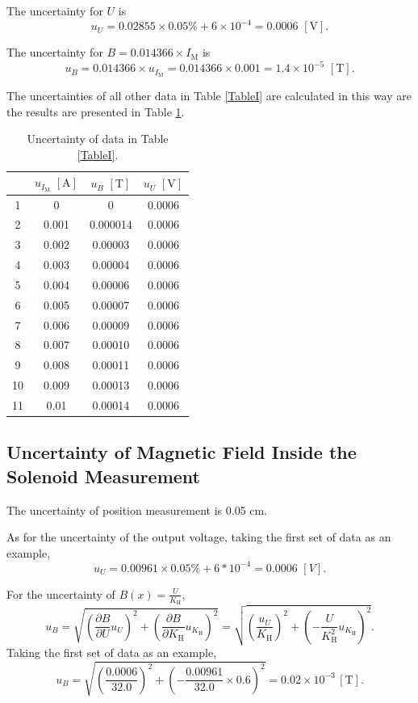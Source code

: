 \documentclass{article}
\begin{document}
The uncertainty for $U$ is 
$$u_U = 0.02855\times 0.05\%+6\times10^{-4} = 0.0006\,\,[\text{V}].$$

The uncertainty for $B = 0.014366 \times I_\text{M}$ is
$$u_B = 0.014366 \times u_{I_\text{M}} = 0.014366 \times 0.001 = 1.4\times 10^{-5}\,\,[\text{T}].$$

The uncertainties of all other data in Table \ref{TableI} are calculated in this way are the results are presented in Table \ref{TableUncI}.

\begin{table}[H]
\centering
\begin{tabular}{cccc}
\toprule
& $u_{I_\text{M}}\,\,[\text{A}]$ & $u_B\,\,[\text{T}]$ & $u_U\,\,[\text{V}]$\\
\midrule
    1     & 0 & 0   & 0.0006 \\
    2     & 0.001 & 0.000014  & 0.0006 \\
    3     & 0.002 & 0.00003  & 0.0006 \\
    4     & 0.003 & 0.00004  & 0.0006 \\
    5     & 0.004 & 0.00006  & 0.0006 \\
    6     & 0.005 & 0.00007  & 0.0006 \\
    7     & 0.006 & 0.00009  & 0.0006 \\
    8     & 0.007 & 0.00010  & 0.0006 \\
    9     & 0.008 & 0.00011  & 0.0006 \\
    10    & 0.009 & 0.00013  & 0.0006 \\
    11    & 0.01  & 0.00014  & 0.0006 \\
\bottomrule
\end{tabular}
\caption{Uncertainty of data in Table \ref{TableI}.}\label{TableUncI}
\end{table}

	\subsection{Uncertainty of Magnetic Field Inside the Solenoid Measurement}

The uncertainty of position measurement is 0.05 cm.

As for the uncertainty of the output voltage, taking the first set of data as an example,
$$u_U = 0.00961 \times 0.05\% + 6*10^{-4} = 0.0006\,\,[V].$$

For the uncertainty of $\displaystyle B(x) =\frac{U}{K_\text{H}}$,
$$ u_B = \sqrt{(\frac{\partial B}{\partial U}u_U)^2 + (\frac{\partial B}{\partial K_\text{H}}u_{K_\text{H}})^2} = \sqrt{(\frac{u_U}{K_\text{H}})^2 + (-\frac{U}{K_\text{H}^2}u_{K_\text{H}})^2}. $$
Taking the first set of data as an example,
$$  u_B = \sqrt{(\frac{0.0006}{32.0})^2 + (-\frac{0.00961}{32.0}\times 0.6)^2} = 0.02 \times10^{-3}\,[\text{T}]. $$
\end{document}
